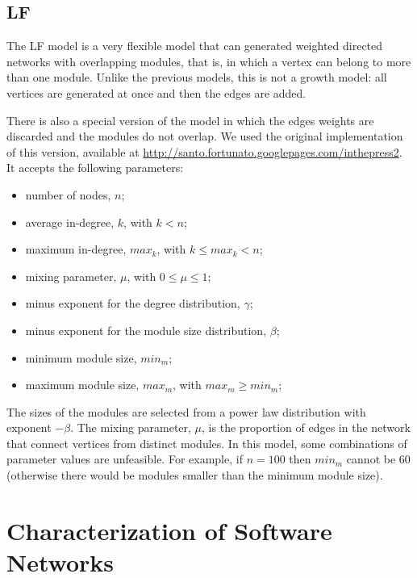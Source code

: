 \subsection{LF}

The LF model \cite{Lancichinetti2009} is a very flexible model that can
generated weighted directed networks with overlapping modules, that is, in which
a vertex can belong to more than one module. Unlike the previous models, this is
not a growth model: all vertices are generated at once and then the edges are
added.

There is also a special version of the model in which the edges weights are
discarded and the modules do not overlap. We used the original implementation of
this version, available at
\url{http://santo.fortunato.googlepages.com/inthepress2}. It accepts the
following parameters:

\begin{itemize}
\item number of nodes, $n$;
\item average in-degree, $k$, with $k < n$;
\item maximum in-degree, $max_k$, with $k \le max_k < n$;
\item mixing parameter, $\mu$, with $0 \le \mu \le 1$;
\item minus exponent for the degree distribution, $\gamma$;
\item minus exponent for the module size distribution, $\beta$;
\item minimum module size, $min_m$;
\item maximum module size, $max_m$, with $max_m \ge min_m$;
\end{itemize}

The sizes of the modules are selected from a power law distribution with
exponent $-\beta$. The mixing parameter, $\mu$, is the proportion of edges in the
network that connect vertices from distinct modules. In this model, some
combinations of parameter values are unfeasible. For example, if $n = 100$ then
$min_m$ cannot be 60 (otherwise there would be modules smaller than the minimum
module size).


\section{Characterization of Software Networks} \label{sec:characterization}

